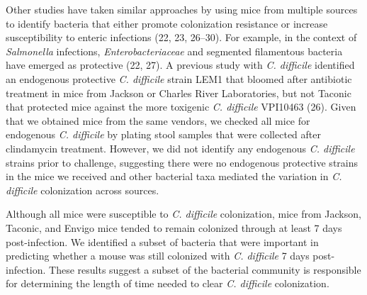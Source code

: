 \documentclass[11pt,]{article}
\begin{document}
Other studies have taken similar approaches by using mice from multiple
sources to identify bacteria that either promote colonization resistance
or increase susceptibility to enteric infections (22, 23, 26--30). For
example, in the context of \emph{Salmonella} infections,
\emph{Enterobacteriaceae} and segmented filamentous bacteria have
emerged as protective (22, 27). A previous study with \emph{C.
difficile} identified an endogenous protective \emph{C. difficile}
strain LEM1 that bloomed after antibiotic treatment in mice from Jackson
or Charles River Laboratories, but not Taconic that protected mice
against the more toxigenic \emph{C. difficile} VPI10463 (26). Given that
we obtained mice from the same vendors, we checked all mice for
endogenous \emph{C. difficile} by plating stool samples that were
collected after clindamycin treatment. However, we did not identify any
endogenous \emph{C. difficile} strains prior to challenge, suggesting
there were no endogenous protective strains in the mice we received and
other bacterial taxa mediated the variation in \emph{C. difficile}
colonization across sources.

Although all mice were susceptible to \emph{C. difficile} colonization,
mice from Jackson, Taconic, and Envigo mice tended to remain colonized
through at least 7 days post-infection. We identified a subset of
bacteria that were important in predicting whether a mouse was still
colonized with \emph{C. difficile} 7 days post-infection. These results
suggest a subset of the bacterial community is responsible for
determining the length of time needed to clear \emph{C. difficile}
colonization.
\end{document}

